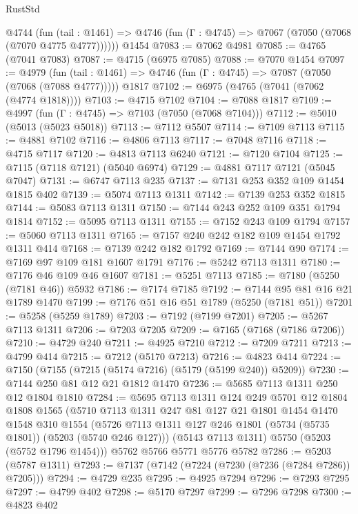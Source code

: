 \begin{lexlean}{RustStd}
\begin{coremodule}
    @4744
      (fun (tail : @1461) => @4746 (fun (Γ : @4745) => @7067 (@7050 (@7068 (@7070 @4775 @4777))))))
    @1454
@7083 := @7062 @4981
@7085 := @4765 (@7041 @7083)
@7087 := @4715 (@6975 @7085)
@7088 := @7070 @1454
@7097 := @4979
    (fun (tail : @1461) => @4746 (fun (Γ : @4745) => @7087 (@7050 (@7068 (@7088 @4777)))))
    @1817
@7102 := @6975 (@4765 (@7041 (@7062 (@4774 @1818))))
@7103 := @4715 @7102
@7104 := @7088 @1817
@7109 := @4997 (fun (Γ : @4745) => @7103 (@7050 (@7068 @7104)))
@7112 := @5010 (@5013 (@5023 @5018))
@7113 := @7112 @5507
@7114 := @7109 @7113
@7115 := @4881 @7102
@7116 := @4806 @7113
@7117 := @7048 @7116
@7118 := @4715 @7117
@7120 := @4813 @7113 @6240
@7121 := @7120 @7104
@7125 := @7115 (@7118 @7121) (@5040 @6974)
@7129 := @4881 @7117 @7121 (@5045 @7047)
@7131 := @6747 @7113 @235
@7137 := @7131 @253 @352 @109 @1454 @1815 @402
@7139 := @5074 @7113 @1311
@7142 := @7139 @253 @352 @1815
@7144 := @5083 @7113 @1311
@7150 := @7144 @243 @252 @109 @351 @1794 @1814
@7152 := @5095 @7113 @1311
@7155 := @7152 @243 @109 @1794
@7157 := @5060 @7113 @1311
@7165 := @7157 @240 @242 @182 @109 @1454 @1792 @1311 @414
@7168 := @7139 @242 @182 @1792
@7169 := @7144 @90
@7174 := @7169 @97 @109 @181 @1607 @1791
@7176 := @5242 @7113 @1311
@7180 := @7176 @46 @109 @46 @1607
@7181 := @5251 @7113
@7185 := @7180 (@5250 (@7181 @46)) @5932
@7186 := @7174 @7185
@7192 := @7144 @95 @81 @16 @21 @1789 @1470
@7199 := @7176 @51 @16 @51 @1789 (@5250 (@7181 @51))
@7201 := @5258 (@5259 @1789)
@7203 := @7192 (@7199 @7201)
@7205 := @5267 @7113 @1311
@7206 := @7203 @7205
@7209 := @7165 (@7168 (@7186 @7206))
@7210 := @4729 @240
@7211 := @4925 @7210
@7212 := @7209 @7211
@7213 := @4799 @414
@7215 := @7212 (@5170 @7213)
@7216 := @4823 @414
@7224 := @7150 (@7155 (@7215 (@5174 @7216) (@5179 (@5199 @240)) @5209))
@7230 := @7144 @250 @81 @12 @21 @1812 @1470
@7236 := @5685 @7113 @1311 @250 @12 @1804 @1810
@7284 := @5695
    @7113
    @1311
    @124
    @249
    @5701
    @12
    @1804
    @1808
    @1565
    (@5710
      @7113
      @1311
      @247
      @81
      @127
      @21
      @1801
      @1454
      @1470
      @1548
      @310
      @1554
      (@5726 @7113 @1311 @127 @246 @1801 (@5734 (@5735 @1801)) (@5203 (@5740 @246 @127)))
      (@5143 @7113 @1311)
      @5750
      (@5203 (@5752 @1796 @1454)))
    @5762
    @5766
    @5771
    @5776
    @5782
@7286 := @5203 (@5787 @1311)
@7293 := @7137 (@7142 (@7224 (@7230 (@7236 (@7284 @7286)) @7205)))
@7294 := @4729 @235
@7295 := @4925 @7294
@7296 := @7293 @7295
@7297 := @4799 @402
@7298 := @5170 @7297
@7299 := @7296 @7298
@7300 := @4823 @402

\end{coremodule}
\end{lexlean}

